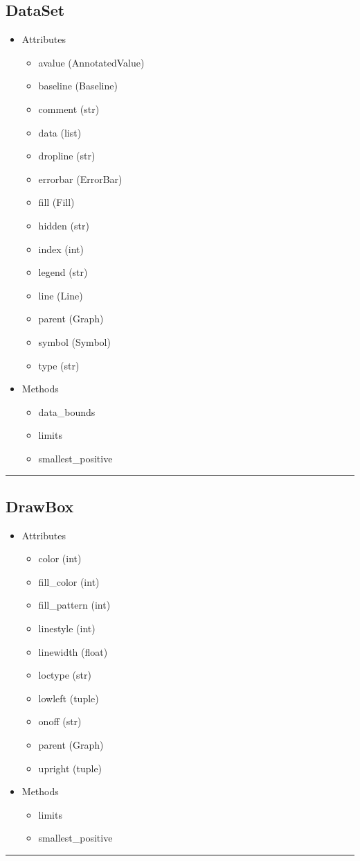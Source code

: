 \documentclass[10pt]{article}
\begin{document}
\begin{multicols}{4}
\subsection*{\footnotesize DataSet}
\begin{itemize}
\item Attributes
\begin{itemize}
\item avalue (AnnotatedValue)
\item baseline (Baseline)
\item comment (str)
\item data (list)
\item dropline (str)
\item errorbar (ErrorBar)
\item fill (Fill)
\item hidden (str)
\item index (int)
\item legend (str)
\item line (Line)
\item parent (Graph)
\item symbol (Symbol)
\item type (str)
\end{itemize}
\item Methods
\begin{itemize}
\item data\_bounds
\item limits
\item smallest\_positive
\end{itemize}
\end{itemize}
\vspace{0.5em}
\hrule
\vspace{0.1em}
\subsection*{\footnotesize DrawBox}
\begin{itemize}
\item Attributes
\begin{itemize}
\item color (int)
\item fill\_color (int)
\item fill\_pattern (int)
\item linestyle (int)
\item linewidth (float)
\item loctype (str)
\item lowleft (tuple)
\item onoff (str)
\item parent (Graph)
\item upright (tuple)
\end{itemize}
\item Methods
\begin{itemize}
\item limits
\item smallest\_positive
\end{itemize}
\end{itemize}
\vspace{0.5em}
\hrule
\vspace{0.1em}

\end{multicols}
\end{document}
